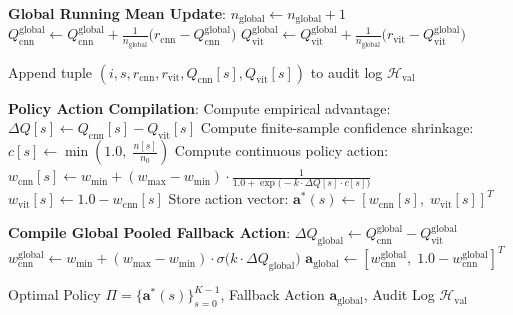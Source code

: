 \documentclass[10pt,journal,compsoc]{IEEEtran}
\begin{document}
\begin{algorithm}[H]
\begin{algorithmic}[1]
    \STATE \textbf{Global Running Mean Update}:
    \STATE $n_{\text{global}} \leftarrow n_{\text{global}} + 1$
    \STATE $Q_{\text{cnn}}^{\text{global}} \leftarrow Q_{\text{cnn}}^{\text{global}} + \frac{1}{n_{\text{global}}} \Big( r_{\text{cnn}} - Q_{\text{cnn}}^{\text{global}} \Big)$
    \STATE $Q_{\text{vit}}^{\text{global}} \leftarrow Q_{\text{vit}}^{\text{global}} + \frac{1}{n_{\text{global}}} \Big( r_{\text{vit}} - Q_{\text{vit}}^{\text{global}} \Big)$
    
    \STATE Append tuple $(i, s, r_{\text{cnn}}, r_{\text{vit}}, Q_{\text{cnn}}[s], Q_{\text{vit}}[s])$ to audit log $\mathcal{H}_{\text{val}}$
\ENDFOR

\STATE \textbf{Policy Action Compilation}:
    \STATE Compute empirical advantage: $\Delta Q[s] \leftarrow Q_{\text{cnn}}[s] - Q_{\text{vit}}[s]$
    \STATE Compute finite-sample confidence shrinkage: $c[s] \leftarrow \min\left(1.0, \; \frac{n[s]}{n_0}\right)$
    \STATE Compute continuous policy action:
    \STATE \quad $w_{\text{cnn}}[s] \leftarrow w_{\min} + (w_{\max} - w_{\min}) \cdot \frac{1}{1.0 + \exp\big(-k \cdot \Delta Q[s] \cdot c[s]\big)}$
    \STATE \quad $w_{\text{vit}}[s] \leftarrow 1.0 - w_{\text{cnn}}[s]$
    \STATE Store action vector: $\mathbf{a}^*(s) \leftarrow [w_{\text{cnn}}[s], \; w_{\text{vit}}[s]]^T$
\ENDFOR

\STATE \textbf{Compile Global Pooled Fallback Action}:
\STATE $\Delta Q_{\text{global}} \leftarrow Q_{\text{cnn}}^{\text{global}} - Q_{\text{vit}}^{\text{global}}$
\STATE $w_{\text{cnn}}^{\text{global}} \leftarrow w_{\min} + (w_{\max} - w_{\min}) \cdot \sigma\big(k \cdot \Delta Q_{\text{global}}\big)$
\STATE $\mathbf{a}_{\text{global}} \leftarrow [w_{\text{cnn}}^{\text{global}}, \; 1.0 - w_{\text{cnn}}^{\text{global}}]^T$

\RETURN Optimal Policy $\Pi = \{\mathbf{a}^*(s)\}_{s=0}^{K-1}$, Fallback Action $\mathbf{a}_{\text{global}}$, Audit Log $\mathcal{H}_{\text{val}}$
\end{algorithmic}
\end{algorithm}
\end{document}
